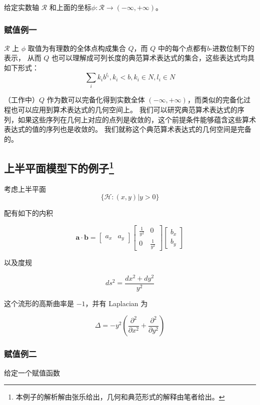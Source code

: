 \documentclass[a4paper,12pt]{article}
\numberwithin{definition}{section}
\numberwithin{lemma}{section}
\numberwithin{proposition}{section}
\numberwithin{theorem}{section}
\numberwithin{grammar}{section}
\numberwithin{program}{section}
\numberwithin{convention}{section}
\numberwithin{corollary}{section}
\begin{document}
给定实数轴 $\mathcal{R}$ 和上面的坐标$\phi: \mathcal{R} \to (-\infty, +\infty)$。

\subsubsection{赋值例一}\label{subsec:exmp1}

$\mathcal{R}$ 上 $\phi$ 取值为有理数的全体点构成集合 $Q$，而 $Q$ 中的每个点都有$b$-进数位制下的表示，
从而 $Q$ 也可以理解成可列长度的典范算术表达式的集合，这些表达式均具如下形式：
$$
\sum_{i} k_i b^{l_i}, k_i < b, k_i \in N, l_i \in N
$$

（工作中）$Q$ 作为数可以完备化得到实数全体 $(-\infty, +\infty)$，而类似的完备化过程也可以应用到算术表达式的几何空间上。
我们可以研究典范算术表达式的序列，如果这些序列在几何上对应的点列是收敛的，这个前提条件能够蕴含这些算术表达式的值的序列也是收敛的。
我们就称这个典范算术表达式的几何空间是完备的。

\subsection{上半平面模型下的例子\footnote{本例子的解析解由张乐给出，几何和典范形式的解释由笔者给出。}}

考虑上半平面
\[
\{\mathcal{H}: (x, y) | y > 0 \}
\]

配有如下的内积

\[
\mathbf{a} \cdot \mathbf{b} = \begin{bmatrix} a_x & a_y \end{bmatrix} \begin{bmatrix} \frac{1}{y^2} & 0 \\ 0 & \frac{1}{y^2} \end{bmatrix} \begin{bmatrix} b_x \\ b_y \end{bmatrix}
\]

以及度规

\[
ds^2 = \frac{dx^2 + dy^2}{y^2}
\]

这个流形的高斯曲率是 $-1$，并有 Laplacian 为

\[
\Delta = - y^2 (\frac{\partial^2}{\partial x^2} + \frac{\partial^2}{\partial y^2})
\]

\subsubsection{赋值例二}\label{subsec:exmp2}

给定一个赋值函数
\end{document}
